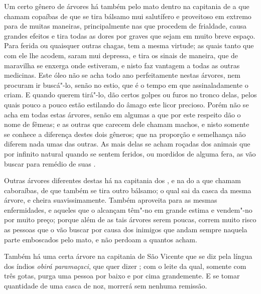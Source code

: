 Um certo gênero de árvores há também pelo mato dentro na capitania de
 a que chamam copaíbas de que se tira bálsamo mui		        %
salutífero e proveitoso em extremo para  de muitas			%
maneiras, principalmente nas que procedem de frialdade, causa grandes
efeitos e tira todas as dores por graves que sejam em muito breve espaço. Para ferida ou
quaisquer outras chagas, tem a mesma virtude; as quais tanto que com
ele lhe acodem, saram mui depressa, e tira os sinais de maneira, que
de maravilha se enxerga onde estiveram, e nisto faz vantagem a todas as
outras medicinas. Este óleo não se acha todo ano perfeitamente nestas
árvores, nem procuram ir buscá"-lo, senão no estio, que é o tempo em que
assinaladamente o criam. E quando querem tirá"-lo, dão certos golpes ou
furos no tronco delas, pelos quais pouco a pouco estão estilando do
âmago este licor precioso. Porém não se acha em todas estas árvores,
senão em algumas a que por este respeito dão o nome de fêmeas; e as
outras que carecem dele chamam machos, e nisto somente se conhece a
diferença destes dois gêneros; que na proporção e semelhança não
diferem nada umas das outras. As mais delas se acham roçadas dos animais
que por infinito natural quando se sentem feridos, ou mordidos de alguma
fera, as vão buscar para remédio de suas .

Outras árvores diferentes destas há na capitania dos , 
e na do  a que chamam caboraíbas, de que também se tira outro			%
bálsamo; o qual sai da casca da mesma árvore, e cheira suavissimamente.
Também aproveita para as mesmas enfermidades, e aqueles que o alcançam
têm"-no em grande estima e vendem"-no por muito preço; porque além de as
tais árvores serem poucas, correm muito risco as pessoas que o vão
buscar por causa dos inimigos que andam sempre naquela parte emboscados
pelo mato, e não perdoam a quantos acham.

Também há uma certa árvore na capitania de São Vicente que se diz pela				%
língua dos índios \textit{obirá paramaçaci}, que quer dizer ; com o leite da qual, somente com três gotas, purga uma
pessoa por baixo e por cima grandemente. E se tomar quantidade de uma				%
casca de noz, morrerá sem nenhuma remissão.


